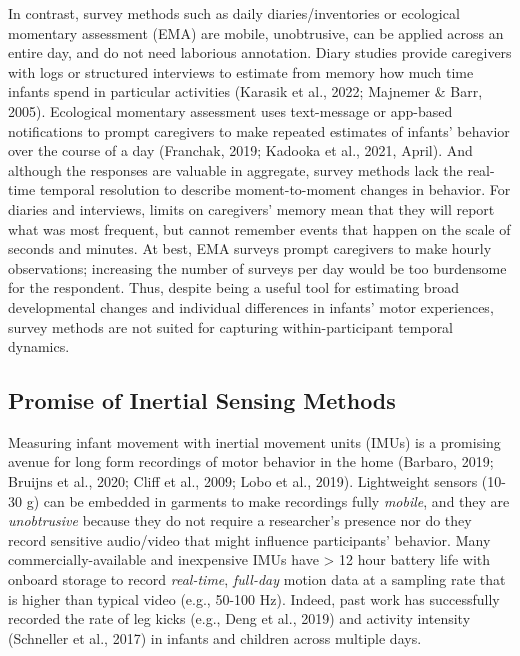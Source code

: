 \documentclass[
  man]{apa6}
\begin{document}
In contrast, survey methods such as daily diaries/inventories or ecological momentary assessment (EMA) are mobile, unobtrusive, can be applied across an entire day, and do not need laborious annotation. Diary studies provide caregivers with logs or structured interviews to estimate from memory how much time infants spend in particular activities (Karasik et al., 2022; Majnemer \& Barr, 2005). Ecological momentary assessment uses text-message or app-based notifications to prompt caregivers to make repeated estimates of infants' behavior over the course of a day (Franchak, 2019; Kadooka et al., 2021, April). And although the responses are valuable in aggregate, survey methods lack the real-time temporal resolution to describe moment-to-moment changes in behavior. For diaries and interviews, limits on caregivers' memory mean that they will report what was most frequent, but cannot remember events that happen on the scale of seconds and minutes. At best, EMA surveys prompt caregivers to make hourly observations; increasing the number of surveys per day would be too burdensome for the respondent. Thus, despite being a useful tool for estimating broad developmental changes and individual differences in infants' motor experiences, survey methods are not suited for capturing within-participant temporal dynamics.

\hypertarget{promise-of-inertial-sensing-methods}{%
\subsection{Promise of Inertial Sensing Methods}\label{promise-of-inertial-sensing-methods}}

Measuring infant movement with inertial movement units (IMUs) is a promising avenue for long form recordings of motor behavior in the home (Barbaro, 2019; Bruijns et al., 2020; Cliff et al., 2009; Lobo et al., 2019). Lightweight sensors (10-30 g) can be embedded in garments to make recordings fully \emph{mobile}, and they are \emph{unobtrusive} because they do not require a researcher's presence nor do they record sensitive audio/video that might influence participants' behavior. Many commercially-available and inexpensive IMUs have \textgreater{} 12 hour battery life with onboard storage to record \emph{real-time}, \emph{full-day} motion data at a sampling rate that is higher than typical video (e.g., 50-100 Hz). Indeed, past work has successfully recorded the rate of leg kicks (e.g., Deng et al., 2019) and activity intensity (Schneller et al., 2017) in infants and children across multiple days.
\end{document}
